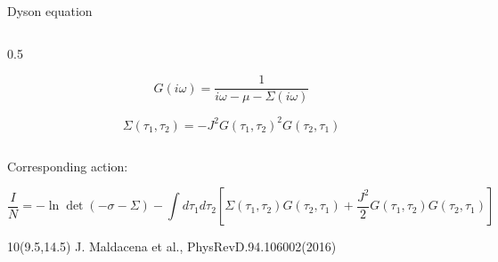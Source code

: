 \begin{frame}{Dyson equation}
\begin{columns}
\begin{column}{0.5\textwidth}
\begin{center}
$$G(i\omega) = \frac{1}{i\omega -\mu - \Sigma(i\omega)}$$

$$\Sigma(\tau_1, \tau_2) = -J^2 G(\tau_1, \tau_2)^2 G(\tau_2, \tau_1)$$


\end{center}
\end{column}
\end{columns}

Corresponding action:

$$\frac{I}{N} = -\ln\det (-\sigma - \Sigma) - \int d\tau_1 d\tau_2 [\Sigma(\tau_1, \tau_2) G(\tau_2, \tau_1) + \frac{J^2}{2} G(\tau_1, \tau_2) G(\tau_2, \tau_1)]$$

\begin{textblock}{10}(9.5,14.5)
\scriptsize
J. Maldacena et al., PhysRevD.94.106002(2016)
\end{textblock}
\end{frame}

